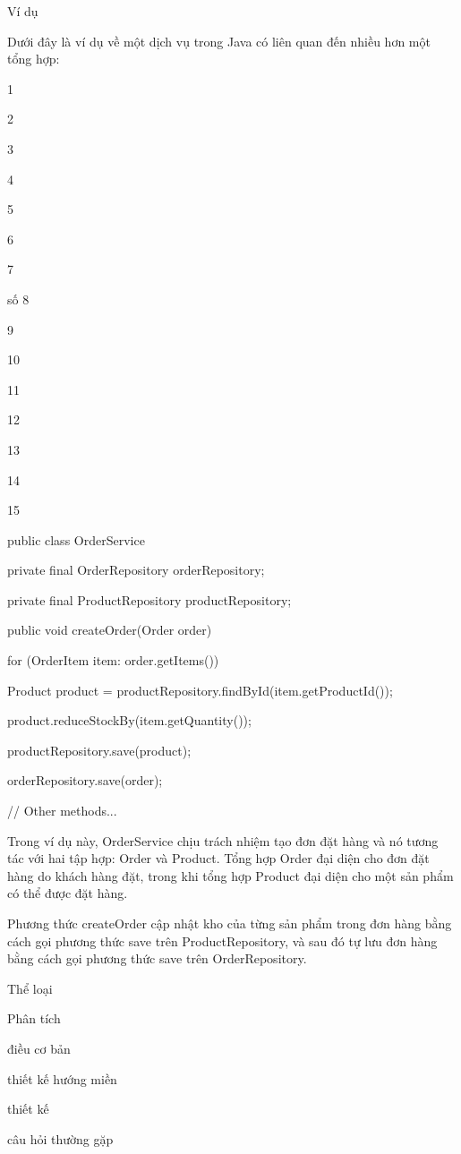 Ví dụ

Dưới đây là ví dụ về một dịch vụ trong Java có liên quan đến nhiều hơn một tổng hợp:

1

2

3

4

5

6

7

số 8

9

10

11

12

13

14

15

public class OrderService {

private final OrderRepository orderRepository;

private final ProductRepository productRepository;

public void createOrder(Order order) {

for (OrderItem item: order.getItems()) {

Product product = productRepository.findById(item.getProductId());

product.reduceStockBy(item.getQuantity());

productRepository.save(product);

}

orderRepository.save(order);

}

// Other methods...

}

Trong ví dụ này, OrderService chịu trách nhiệm tạo đơn đặt hàng và nó tương tác với hai tập hợp: Order và Product. Tổng hợp Order đại diện cho đơn đặt hàng do khách hàng đặt, trong khi tổng hợp Product đại diện cho một sản phẩm có thể được đặt hàng.

Phương thức createOrder cập nhật kho của từng sản phẩm trong đơn hàng bằng cách gọi phương thức save trên ProductRepository, và sau đó tự lưu đơn hàng bằng cách gọi phương thức save trên OrderRepository.

Thể loại

Phân tích

điều cơ bản

thiết kế hướng miền

thiết kế

câu hỏi thường gặp

